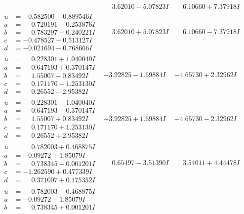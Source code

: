 \documentclass[1p]{elsarticle_modified}
\theoremstyle{definition}
\begin{document}
$$\begin{array}{c|c|c}
 & \phantom{-}3.62010 - 5.07823 I & \phantom{-}6.10660 + 7.37918 I \\ \hline\begin{aligned}
u &= -0.582500 - 0.889546 I \\
a &= \phantom{-}0.720191 - 0.253876 I \\
b &= \phantom{-}0.783297 - 0.240221 I \\
c &= -0.478527 - 0.513127 I \\
d &= -0.021694 - 0.768666 I\end{aligned}
 & \phantom{-}3.62010 + 5.07823 I & \phantom{-}6.10660 - 7.37918 I \\ \hline\begin{aligned}
u &= \phantom{-}0.228301 + 1.040040 I \\
a &= \phantom{-}0.647193 + 0.370147 I \\
b &= \phantom{-}1.55007 - 0.83492 I \\
c &= \phantom{-}0.171170 - 1.253130 I \\
d &= \phantom{-}0.26552 - 2.95382 I\end{aligned}
 & -3.92825 - 1.69884 I & -4.65730 + 2.32962 I \\ \hline\begin{aligned}
u &= \phantom{-}0.228301 - 1.040040 I \\
a &= \phantom{-}0.647193 - 0.370147 I \\
b &= \phantom{-}1.55007 + 0.83492 I \\
c &= \phantom{-}0.171170 + 1.253130 I \\
d &= \phantom{-}0.26552 + 2.95382 I\end{aligned}
 & -3.92825 + 1.69884 I & -4.65730 - 2.32962 I \\ \hline\begin{aligned}
u &= \phantom{-}0.782003 + 0.468875 I \\
a &= -0.09272 + 1.85079 I \\
b &= \phantom{-}0.738345 - 0.001201 I \\
c &= -1.262590 + 0.477339 I \\
d &= \phantom{-}0.371007 + 0.175352 I\end{aligned}
 & \phantom{-}0.65497 - 3.51390 I & \phantom{-}3.54011 + 4.44478 I \\ \hline\begin{aligned}
u &= \phantom{-}0.782003 - 0.468875 I \\
a &= -0.09272 - 1.85079 I \\
b &= \phantom{-}0.738345 + 0.001201 I \\

\end{aligned}
\end{array}$$
\end{document}
